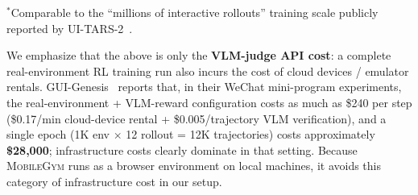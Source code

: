 \documentclass{llmxive}
\providecommand{\sys}{\textsc{MobileGym}}
\begin{document}
\begin{table}[!htbp]
  \centering\small
  \setlength{\tabcolsep}{3pt}
  \caption{Cumulative cost at large-scale RL training if a VLM judge were used}
  \label{tab:cost-scale}
\end{table}

$^*$Comparable to the ``millions of interactive rollouts'' training scale publicly reported by UI-TARS-2~\cite{UITARS2}.

We emphasize that the above is only the \textbf{VLM-judge API cost}: a complete real-environment RL training run also incurs the cost of cloud devices / emulator rentals. GUI-Genesis~\cite{GUI-GENESIS} reports that, in their WeChat mini-program experiments, the real-environment + VLM-reward configuration costs as much as \$240 per step (\$0.17/min cloud-device rental + \$0.005/trajectory VLM verification), and a single epoch (1K env $\times$ 12 rollout = 12K trajectories) costs approximately \textbf{\$28,000}; infrastructure costs clearly dominate in that setting. Because \sys{} runs as a browser environment on local machines, it avoids this category of infrastructure cost in our setup.
\end{document}
